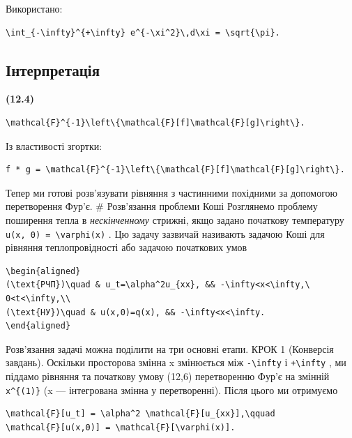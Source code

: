 \documentclass[
  ukrainian,
]{article}
\begin{document}
Використано:

\begin{verbatim}
\int_{-\infty}^{+\infty} e^{-\xi^2}\,d\xi = \sqrt{\pi}.
\end{verbatim}

\subsection{Інтерпретація}\label{ux456ux43dux442ux435ux440ux43fux440ux435ux442ux430ux446ux456ux44f}

\textbf{(12.4)}

\begin{verbatim}
\mathcal{F}^{-1}\left\{\mathcal{F}[f]\mathcal{F}[g]\right\}.
\end{verbatim}

Із властивості згортки:

\begin{verbatim}
f * g = \mathcal{F}^{-1}\left\{\mathcal{F}[f]\mathcal{F}[g]\right\}.
\end{verbatim}

Тепер ми готові розв'язувати рівняння з частинними похідними за
допомогою перетворення Фур'є. \# Розв'язання проблеми Коші Розглянемо
проблему поширення тепла в \emph{нескінченному} стрижні, якщо задано
початкову температуру \texttt{u(x,\ 0)\ =\ \textbackslash{}varphi(x)} .
Цю задачу зазвичай називають задачою Коші для рівняння теплопровідності
або задачою початкових умов

\begin{verbatim}
\begin{aligned}
(\text{РЧП})\quad & u_t=\alpha^2u_{xx}, && -\infty<x<\infty,\ 0<t<\infty,\\
(\text{НУ})\quad & u(x,0)=q(x), && -\infty<x<\infty.
\end{aligned}
\end{verbatim}

Розв'язання задачі можна поділити на три основні етапи. КРОК 1
(Конверсія завдань). Оскільки просторова змінна x змінюється між
\texttt{-\textbackslash{}infty} і \texttt{+\textbackslash{}infty} , ми
піддамо рівняння та початкову умову (12,6) перетворенню Фур'є на змінній
\texttt{x\^{}\{(1)\}} (x --- інтегрована змінна у перетворенні). Після
цього ми отримуємо

\begin{verbatim}
\mathcal{F}[u_t] = \alpha^2 \mathcal{F}[u_{xx}],\qquad
\mathcal{F}[u(x,0)] = \mathcal{F}[\varphi(x)].
\end{verbatim}
\end{document}
